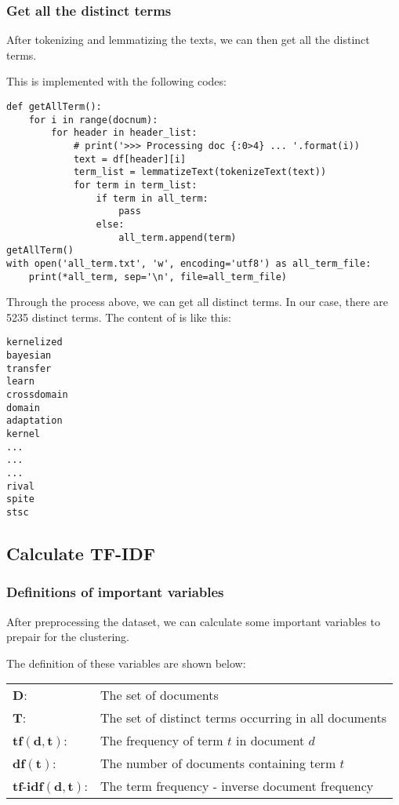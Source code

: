 \documentclass[a4paper, 12pt]{article}
\begin{document}
\subsubsection{Get all the distinct terms}
After tokenizing and lemmatizing the texts, we can then get all the distinct terms.

This is implemented with the following codes:

\begin{lstlisting}[style=myPython,caption={Get all items}]
def getAllTerm():
    for i in range(docnum):
        for header in header_list:
            # print('>>> Processing doc {:0>4} ... '.format(i))
            text = df[header][i]
            term_list = lemmatizeText(tokenizeText(text))
            for term in term_list:
                if term in all_term:
                    pass
                else:
                    all_term.append(term)
getAllTerm()
with open('all_term.txt', 'w', encoding='utf8') as all_term_file:
    print(*all_term, sep='\n', file=all_term_file)
\end{lstlisting}

Through the process above, we can get all distinct terms. In our case, there are 5235 distinct terms. The content of  is like this:

\begin{lstlisting}[style=plainText, caption={all\_term.txt}]
kernelized
bayesian
transfer
learn
crossdomain
domain
adaptation
kernel
...
...
...
rival
spite
stsc
\end{lstlisting}

\subsection{Calculate TF-IDF}

\subsubsection{Definitions of important variables}
After preprocessing the dataset, we can calculate some important variables to prepair for the clustering.

The definition of these variables are shown below:

\begin{tabularx}{\textwidth}{l X}
$\bm{D}$:          & The set of documents \\
$\bm{T}$:          & The set of distinct terms occurring in all documents \\
$\bm{tf(d,t)}$:    & The frequency of term $t$ in document $d$ \\
$\bm{df(t)}$:      & The number of documents containing term $t$\\
$\bm{tf\text{-}idf(d,t)}$: & The term frequency - inverse document frequency \\
\end{tabularx}
\end{document}

